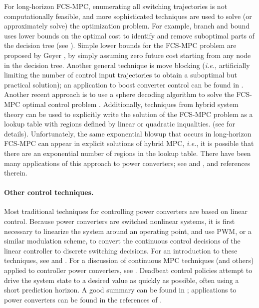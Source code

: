 \documentclass[12pt]{article}
\newcommand{\ie}{{\it i.e.}}
\begin{document}
For long-horizon FCS-MPC, enumerating all switching trajectories
is not computationally feasible,
and more sophisticated techniques are used to solve
(or approximately solve) the optimization problem.
For example, branch and bound uses lower bounds on the optimal cost 
to identify and remove suboptimal parts of
the decision tree (see \cite{boyd2007branch}).
Simple lower bounds for the FCS-MPC problem are proposed by Geyer 
\cite{geyer2011computationally},
by simply assuming zero future cost starting from any node in the decision tree.
Another general technique is move blocking
(\ie, artificially limiting the number of control input trajectories
to obtain a suboptimal but practical solution);
an application to boost converter control can be found in 
\cite{karamanakos2012direct}.
Another recent approach is to use a sphere decoding algorithm to solve
the FCS-MPC optimal control problem \cite{geyer2013multistep}. Additionally, techniques from hybrid system theory can be used to explicitly
write the solution of the FCS-MPC problem
as a lookup table with regions defined by linear or quadratic inqualities.
(see \cite{borrelli} for details).
Unfortunately, the same exponential blowup that occurs in long-horizon
FCS-MPC can appear in explicit solutions of hybrid MPC,
\ie, it is possible that there are an exponential number of regions
in the lookup table.
There have been many applications of this approach to power converters;
see \cite{quevedo2014predictive} and \cite{geyer2005model},
and references therein.


\paragraph{Other control techniques.}
Most traditional techniques for controlling power converters
are based on linear control.
Because power converters are switched nonlinear systems,
it is first necessary to linearize the system around an operating point,
and use PWM, or a similar modulation scheme, to convert the continuous
control decisions of the linear controller to discrete switching decisions.
For an introduction to these techniques, see 
\cite{kassakian1991principles} and \cite{erickson2007fundamentals}.
For a discussion of continuous MPC techniques (and others) applied to
controller power converters, see \cite{wang2014pid}.
Deadbeat control policies attempt to drive the system state to
a desired value as quickly as possible,
often using a short prediction horizon.
A good summary can be found in \cite{quevedo2014predictive};
applications to power converters can be found 
in the references of \cite{kouro2009model}.
\end{document}
